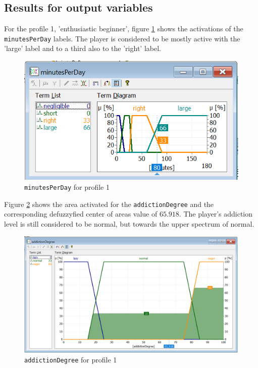 \subsection{Results for output variables}
\label{sub:autoRes}


For the profile 1, 'enthusiastic beginner', figure \ref{fig:p1mpd} shows the activations of the \texttt{minutesPerDay} labels. The player is considered to be mostly active with the 'large' label and to a third also to the 'right' label.

\begin{figure}[H]
\centering
\includegraphics[width=\textwidth]{img/profile1_vMinutesPerDay}
\caption{\texttt{minutesPerDay} for profile 1}
\label{fig:p1mpd} 
\end{figure}

Figure \ref{fig:p1ad} shows the area activated for the \texttt{addictionDegree} and the corresponding defuzzyfied center of areas value of $65.918$. The player's addiction level is still considered to be normal, but towards the upper spectrum of normal.

\begin{figure}[H]
\centering
\includegraphics[width=\textwidth]{img/profile1_vAddictionDegree}
\caption{\texttt{addictionDegree} for profile 1}
\label{fig:p1ad} 
\end{figure}


